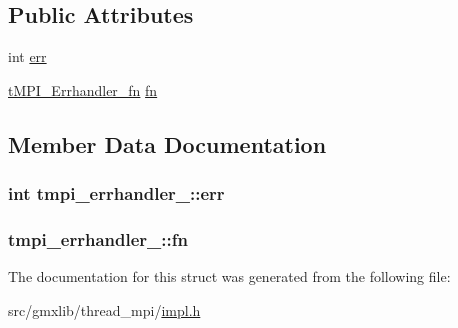\subsection*{\-Public \-Attributes}
\begin{DoxyCompactItemize}
\item 
int \hyperlink{structtmpi__errhandler___a0d0b8b61ee9d28bd58a86663c2723cae}{err}
\item 
\hyperlink{share_2template_2gromacs_2thread__mpi_2tmpi_8h_acd8df331b236188474679949d02810e5}{t\-M\-P\-I\-\_\-\-Errhandler\-\_\-fn} \hyperlink{structtmpi__errhandler___a3190ea703b67ed7c684182cc872cf0be}{fn}
\end{DoxyCompactItemize}


\subsection{\-Member \-Data \-Documentation}
\hypertarget{structtmpi__errhandler___a0d0b8b61ee9d28bd58a86663c2723cae}{
\subsubsection[{err}]{\setlength{\rightskip}{0pt plus 5cm}int {\bf tmpi\-\_\-errhandler\-\_\-\-::err}}}\label{structtmpi__errhandler___a0d0b8b61ee9d28bd58a86663c2723cae}
\hypertarget{structtmpi__errhandler___a3190ea703b67ed7c684182cc872cf0be}{
\subsubsection[{fn}]{ {\bf tmpi\-\_\-errhandler\-\_\-\-::fn}}}\label{structtmpi__errhandler___a3190ea703b67ed7c684182cc872cf0be}


\-The documentation for this struct was generated from the following file\-:\begin{DoxyCompactItemize}
\item 
src/gmxlib/thread\-\_\-mpi/\hyperlink{impl_8h}{impl.\-h}\end{DoxyCompactItemize}
